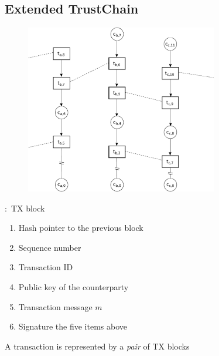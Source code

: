 \documentclass{beamer}
\begin{document}
\subsection{Extended TrustChain}
\begin{frame}{\subsecname}
  \begin{figure}[h]
  \includegraphics[width=0.75\textwidth]{trustchain-good-cp}
  \centering
  \end{figure}
\end{frame}

\begin{frame}{\subsecname:~TX block}
  \begin{enumerate}
    \item Hash pointer to the previous block
    \item Sequence number
    \item Transaction ID
    \item Public key of the counterparty
    \item Transaction message $m$
    \item Signature the five items above
  \end{enumerate}
  \vfill
  A transaction is represented by a \emph{pair} of TX blocks
\end{frame}
\end{document}

